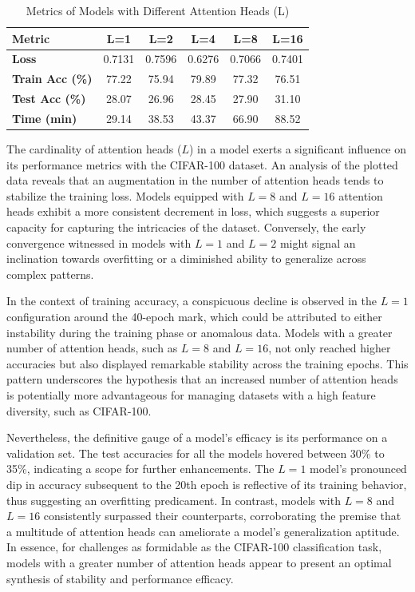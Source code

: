 \documentclass[10pt,twocolumn,letterpaper]{article}
\begin{document}
\begin{table}[h!]
   \centering
   \footnotesize
   \begin{tabular}{lccccc}
      \hline
      \textbf{Metric}         & \textbf{L=1} & \textbf{L=2} & \textbf{L=4} & \textbf{L=8} & \textbf{L=16} \\ \hline
      \textbf{Loss}           & 0.7131       & 0.7596       & 0.6276       & 0.7066       & 0.7401        \\
      \textbf{Train Acc (\%)} & 77.22        & 75.94        & 79.89        & 77.32        & 76.51         \\
      \textbf{Test Acc (\%)}  & 28.07        & 26.96        & 28.45        & 27.90        & 31.10         \\
      \textbf{Time (min)}     & 29.14        & 38.53        & 43.37        & 66.90        & 88.52         \\ \hline
   \end{tabular}
   \caption{Metrics of Models with Different Attention Heads (L)}
   \label{tab:performance_metrics_transposed}
\end{table}



The cardinality of attention heads (\(L\)) in a model exerts a significant influence on its performance metrics with the CIFAR-100 dataset. An analysis of the plotted data reveals that an augmentation in the number of attention heads tends to stabilize the training loss. Models equipped with \(L=8\) and \(L=16\) attention heads exhibit a more consistent decrement in loss, which suggests a superior capacity for capturing the intricacies of the dataset. Conversely, the early convergence witnessed in models with \(L=1\) and \(L=2\) might signal an inclination towards overfitting or a diminished ability to generalize across complex patterns.

In the context of training accuracy, a conspicuous decline is observed in the \(L=1\) configuration around the 40-epoch mark, which could be attributed to either instability during the training phase or anomalous data. Models with a greater number of attention heads, such as \(L=8\) and \(L=16\), not only reached higher accuracies but also displayed remarkable stability across the training epochs. This pattern underscores the hypothesis that an increased number of attention heads is potentially more advantageous for managing datasets with a high feature diversity, such as CIFAR-100.

Nevertheless, the definitive gauge of a model's efficacy is its performance on a validation set. The test accuracies for all the models hovered between 30\% to 35\%, indicating a scope for further enhancements. The \(L=1\) model's pronounced dip in accuracy subsequent to the 20th epoch is reflective of its training behavior, thus suggesting an overfitting predicament. In contrast, models with \(L=8\) and \(L=16\) consistently surpassed their counterparts, corroborating the premise that a multitude of attention heads can ameliorate a model's generalization aptitude. In essence, for challenges as formidable as the CIFAR-100 classification task, models with a greater number of attention heads appear to present an optimal synthesis of stability and performance efficacy.
\end{document}
